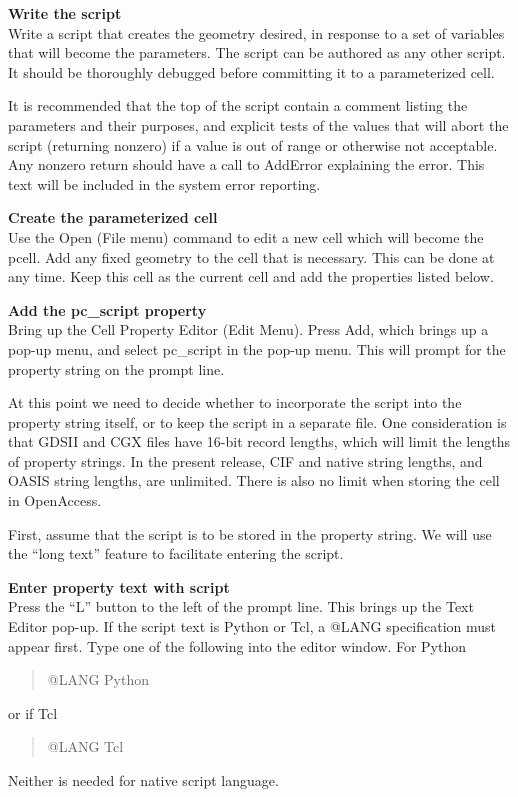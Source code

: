 \begin{description}
\item{\bf Write the script}\\
Write a script that creates the geometry desired, in response
to a set of variables that will become the parameters.  The script
can be authored as any other script.  It should be thoroughly
debugged before committing it to a parameterized cell.

It is recommended that the top of the script contain a comment listing
the parameters and their purposes, and explicit tests of the values
that will abort the script (returning nonzero) if a value is out of
range or otherwise not acceptable.  Any nonzero return should have a
call to {\vt AddError} explaining the error.  This text will be
included in the system error reporting.

\item{\bf Create the parameterized cell}\\
Use the {\cb Open} ({\cb File menu}) command to edit a new cell which
will become the pcell.  Add any fixed geometry to the cell that is
necessary.  This can be done at any time.  Keep this cell as the
current cell and add the properties listed below.

\item{\bf Add the {\et pc\_script} property}\\
Bring up the {\cb Cell Property Editor} ({\cb Edit Menu}).  Press {\cb
Add}, which brings up a pop-up menu, and select {\cb pc\_script} in
the pop-up menu.  This will prompt for the property string on the
prompt line.

At this point we need to decide whether to incorporate the script
into the property string itself, or to keep the script in a separate
file.  One consideration is that GDSII and CGX files have 16-bit record
lengths, which will limit the lengths of property strings.  In the
present {\Xic} release, CIF and native string lengths, and
OASIS string lengths, are unlimited.
\ifoa
There is also no limit when storing the cell in OpenAccess.
\fi

First, assume that the script is to be stored in the property string. 
We will use the ``long text'' feature to facilitate entering the
script.

\item{\bf Enter property text with script}\\
Press the ``{\cb L}'' button to the left of the prompt line.  This
brings up the {\cb Text Editor} pop-up.  If the script text is Python
or Tcl, a {\vt @LANG} specification must appear first.  Type one of
the following into the editor window.  For Python
\begin{quote}
\vt @LANG Python
\end{quote}
or if Tcl
\begin{quote}
\vt @LANG Tcl
\end{quote}
Neither is needed for native script language.


\end{description}
